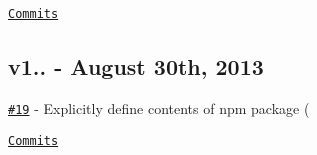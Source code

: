 \href{https://github.com/kpdecker/jsdiff/compare/v1.0.6...v1.0.7}{\tt Commits}

\subsection*{v1.. -\/ August 30th, 2013}


\begin{DoxyItemize}
\item \href{https://github.com/kpdecker/jsdiff/pull/19}{\tt \#19} -\/ Explicitly define contents of npm package (\href{https://api.github.com/users/sindresorhus}{\tt }
\end{DoxyItemize}

\href{https://github.com/kpdecker/jsdiff/compare/v1.0.5...v1.0.6}{\tt Commits} 